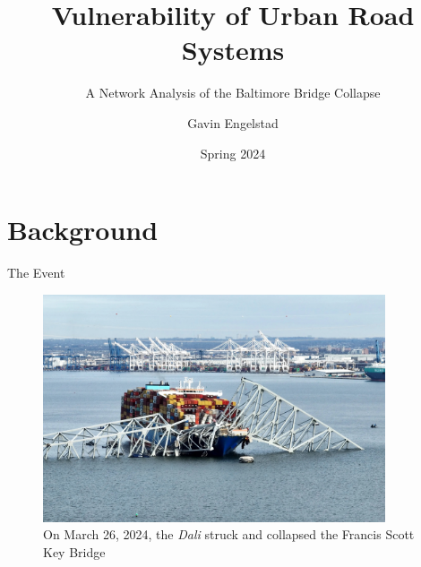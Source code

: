 \documentclass{beamer}
\title{Vulnerability of Urban Road Systems}
\subtitle{A Network Analysis of the Baltimore Bridge Collapse}
\author{Gavin Engelstad}
\date{Spring 2024}
\institute{Macalester College}
\numberwithin{figure}{section} %
\numberwithin{table}{section} %
\begin{document}
\maketitle

\section{Background}

\begin{frame}{The Event}
    \begin{figure}
        \centering
        \includegraphics[width=0.9\textwidth]{pics/Balitmore-Bridge-Collapse.jpeg} \\
        {\scriptsize On March 26, 2024, the \textit{Dali} struck and collapsed the Francis Scott Key Bridge}
    \end{figure}
\end{frame}
\end{document}
